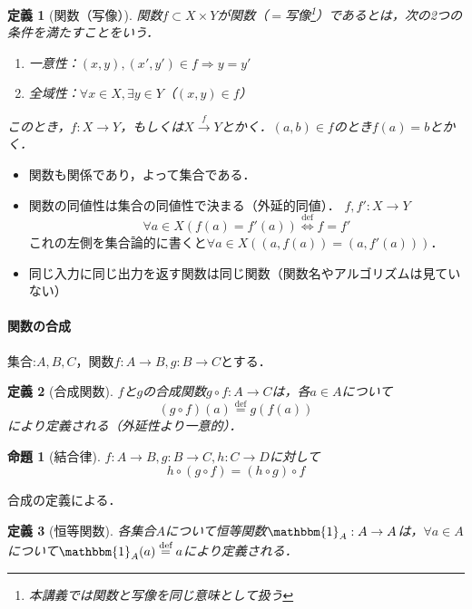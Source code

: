 \documentclass[dvipdfmx,a4j,10pt]{jsarticle}
\makeatletter
\theoremstyle{mystyle1}
\theoremstyle{mystyle2}
\newtheorem{dfn*}{定義}
\newtheorem{prop*}{命題}
\renewenvironment{proof}[1][\proofname]{\par
  \pushQED{\qed}%
  \normalfont
  \topsep6\p@\@plus6\p@ \trivlist
  \item[\hskip\labelsep{\bfseries\sffamily #1}]\ignorespaces
}{%
  \popQED\endtrivlist\@endpefalse
}
\renewcommand\proofname{証明}
\newcommand{\defLeftrightarrow}{\overset{\text{def}}{\iff}}
\newcommand*{\defeq}{\stackrel{\text{def}}{=}}
\makeatother
\begin{document}
\begin{dfn*}[関数（写像）]
    関数$f\subset X\times Y$が関数（$=$写像\footnote{本講義では関数と写像を同じ意味として扱う}）であるとは，次の2つの条件を満たすことをいう．
    \begin{enumerate}
        \item 一意性：$(x,y),(x',y')\in f\Rightarrow y=y'$
        \item 全域性：$\forall x\in X,\exists y \in Y$（$(x,y)\in f$）
    \end{enumerate}
    このとき，$f:X\to Y$，もしくは$X\xrightarrow{f} Y$とかく．$(a,b)\in f$のとき$f(a)=b$とかく．
\end{dfn*}

\begin{itemize}
    \item 関数も関係であり，よって集合である．
    \item 関数の同値性は集合の同値性で決まる（外延的同値）．
          $f,f':X\to Y$
          \[
              \forall a\in X(f(a)=f'(a))\defLeftrightarrow f=f'
          \]
          これの左側を集合論的に書くと$\forall a\in X ((a,f(a))=(a,f'(a)))$．
    \item 同じ入力に同じ出力を返す関数は同じ関数（関数名やアルゴリズムは見ていない）
\end{itemize}

\paragraph{関数の合成}

集合:$A,B,C$，関数$f:A\to B,g:B\to C$とする．

\begin{dfn*}[合成関数]
    $f$と$g$の合成関数$g\circ f:A\to C$は，各$a\in A$について
    \[
        (g\circ f)(a)\defeq g(f(a))
    \]
    により定義される（外延性より一意的）．
\end{dfn*}

\begin{prop*}[結合律]
    $f:A\to B, g:B\to C, h:C\to D$に対して
    \[
        h\circ (g\circ f)=(h\circ g)\circ f
    \]
\end{prop*}
\begin{proof}
    合成の定義による．
\end{proof}

\begin{dfn*}[恒等関数]
    各集合$A$について恒等関数$\mathbbm{1}_A:A\to A$は，$\forall a\in A$について$\mathbbm{1}_A(a)\defeq a$により定義される．
\end{dfn*}
\end{document}
